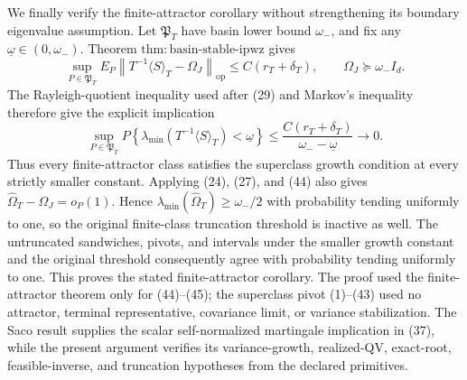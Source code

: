 We finally verify the finite-attractor corollary without strengthening its boundary eigenvalue assumption. Let \(\mathfrak P_T\) have basin lower bound \(\omega_-\), and fix any \(\underline\omega\in(0,\omega_-)\). Theorem \(\mathrm{thm:basin\text{-}stable\text{-}ipwz}\) gives
\[
 \sup_{P\in\mathfrak P_T}E_P\left\|T^{-1}\langle S\rangle_T-\Omega_J\right\|_{\mathrm{op}}
 \le C(r_T+\delta_T),
 \qquad \Omega_J\succeq\omega_-I_d.
\tag{44}
\]
The Rayleigh-quotient inequality used after (29) and Markov's inequality therefore give the explicit implication
\[
 \sup_{P\in\mathfrak P_T}
 P\!\left\{\lambda_{\min}(T^{-1}\langle S\rangle_T)<\underline\omega\right\}
 \le\frac{C(r_T+\delta_T)}{\omega_--\underline\omega}
 \longrightarrow0.
\tag{45}
\]
Thus every finite-attractor class satisfies the superclass growth condition at every strictly smaller constant. Applying (24), (27), and (44) also gives \(\widehat\Omega_T-\Omega_J=o_P(1)\). Hence \(\lambda_{\min}(\widehat\Omega_T)\ge\omega_-/2\) with probability tending uniformly to one, so the original finite-class truncation threshold is inactive as well. The untruncated sandwiches, pivots, and intervals under the smaller growth constant and the original threshold consequently agree with probability tending uniformly to one. This proves the stated finite-attractor corollary. The proof used the finite-attractor theorem only for (44)--(45); the superclass pivot (1)--(43) used no attractor, terminal representative, covariance limit, or variance stabilization. The Saco result supplies the scalar self-normalized martingale implication in (37), while the present argument verifies its variance-growth, realized-QV, exact-root, feasible-inverse, and truncation hypotheses from the declared primitives.